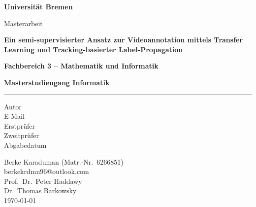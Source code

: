 
\begin{titlepage}
\thispagestyle{empty}
\begin{center}

\vspace*{0.8cm}
{\huge\bfseries Universität Bremen\par}

\vspace{1.6cm}
{\Large Masterarbeit\par}

\vspace{2cm}

{\LARGE\bfseries
Ein semi-supervisierter Ansatz zur Videoannotation mittels Transfer Learning und Tracking-basierter Label-Propagation
\par}

\vspace{1.5cm}

{\Large\bfseries Fachbereich 3 -- Mathematik und Informatik\par}
\vspace{0.2cm}
{\Large\bfseries Masterstudiengang Informatik\par}

\vspace{1.2cm}
{\color{red}\rule{0.92\textwidth}{2pt}}

\end{center}

\vspace{1.8cm}

\noindent
\begin{minipage}[t]{0.46\textwidth}
\raggedright
Autor\\
E-Mail\\[1.2em]
Erstprüfer\\
Zweitprüfer\\[4.5em]
Abgabedatum
\end{minipage}%
\begin{minipage}[t]{0.54\textwidth}
\raggedright
Berke Karaduman (Matr.-Nr.\ 6266851)\\
berkekrdmn96@outlook.com\\[1.2em]
Prof.\ Dr.\ Peter Haddawy\\
Dr.\ Thomas Barkowsky\\[4.5em]
\today
\end{minipage}

\end{titlepage}
